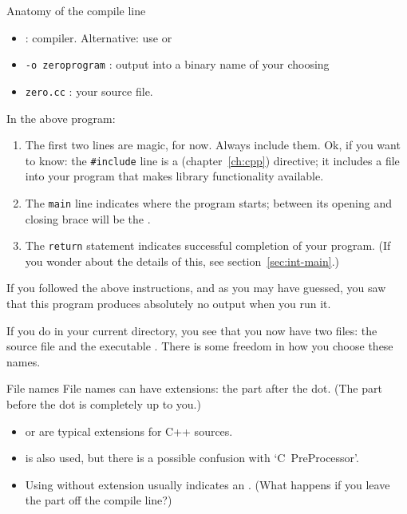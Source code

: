 \begin{slide}{Anatomy of the compile line}
  \label{sl:compile-line}
  \begin{itemize}
  \item {} : compiler. Alternative: use 
    or 
  \item \texttt{-o zeroprogram} : output into a binary name of your choosing
  \item \texttt{zero.cc} : your source file.
  \end{itemize}
\end{slide}

In the above program:
\begin{enumerate}
\item The first two lines are magic, for now. Always include them.
  Ok, if you want to know: the \lstinline+#include+ line
  is a  (chapter~\ref{ch:cpp}) directive;
  it includes a 
  file into your program that makes library functionality available.
\item The \lstinline{main} line indicates where the program starts; between
  its opening and closing brace will be the
  .
\item The \lstinline{return} statement indicates successful completion of your program.
  (If you wonder about the details of this, see section~\ref{sec:int-main}.)
\end{enumerate}
If you followed the above instructions, 
and as you may have guessed,
you saw that this program produces absolutely no output
when you run it.

If you do  in your current directory,
you see that you now have two files: the source file 
and the executable .
There is some freedom in how you choose these names.

\begin{block}{File names}
  \label{sl:file-ext}
  File names can have extensions: the part after the dot.
  (The part before the dot is completely up to you.)
  \begin{itemize}
  \item {} or  are typical extensions for
    C++ sources.
  \item {} is also used, but there is a
    possible confusion with `C~PreProcessor'.
  \item Using  without extension usually indicates an .
    (What happens if you leave the  part off the compile line?)
  \end{itemize}
\end{block}

